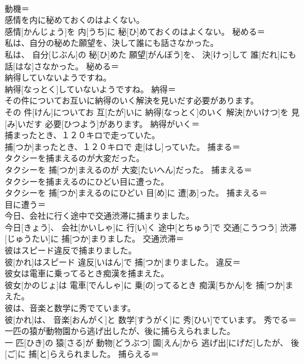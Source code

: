 \documentclass[8pt]{extreport}
\begin{document}
\begin{CJK}{UTF8}{min}
\\	動機＝ 
\\	感情を内に秘めておくのはよくない。	
\\	感情[かんじょう]を 内[うち]に 秘[ひ]めておくのはよくない。	秘める＝ 
\\	私は、自分の秘めた願望を、決して誰にも話さなかった。	
\\	私は、 自分[じぶん]の 秘[ひ]めた 願望[がんぼう]を、 決[けっ]して 誰[だれ]にも 話[はな]さなかった。	秘める＝ 
\\	納得していないようですね。	
\\	納得[なっとく]していないようですね。	納得＝ 
\\	その件についてお互いに納得のいく解決を見いだす必要があります。	
\\	その 件[けん]についてお 互[たが]いに 納得[なっとく]のいく 解決[かいけつ]を 見[み]いだす 必要[ひつよう]があります。	納得がいく＝ 
\\	捕まったとき、１２０キロで走っていた。	
\\	捕[つか]まったとき、１２０キロで 走[はし]っていた。	捕まる＝ 
\\	タクシーを捕まえるのが大変だった。	
\\	タクシーを 捕[つか]まえるのが 大変[たいへん]だった。	捕まえる＝ 
\\	タクシーを捕まえるのにひどい目に遭った。	
\\	タクシーを 捕[つか]まえるのにひどい 目[め]に 遭[あ]った。	捕まえる＝ 
\\	目に遭う＝ 
\\	今日、会社に行く途中で交通渋滞に捕まりました。	
\\	今日[きょう]、 会社[かいしゃ]に 行[い]く 途中[とちゅう]で 交通[こうつう] 渋滞[じゅうたい]に 捕[つか]まりました。	交通渋滞＝ 
\\	彼はスピード違反で捕まりました。	
\\	彼[かれ]はスピード 違反[いはん]で 捕[つか]まりました。	違反＝ 
\\	彼女は電車に乗ってるとき痴漢を捕まえた。	
\\	彼女[かのじょ]は 電車[でんしゃ]に 乗[の]ってるとき 痴漢[ちかん]を 捕[つか]まえた。	
\\	彼は、音楽と数学に秀でています。	
\\	彼[かれ]は、 音楽[おんがく]と 数学[すうがく]に 秀[ひい]でています。	秀でる＝ 
\\	一匹の猿が動物園から逃げ出したが、後に捕らえられました。	
\\	一 匹[ひき]の 猿[さる]が 動物[どうぶつ] 園[えん]から 逃げ出[にげだ]したが、 後[ご]に 捕[と]らえられました。	捕らえる＝ 

\end{CJK}
\end{document}
